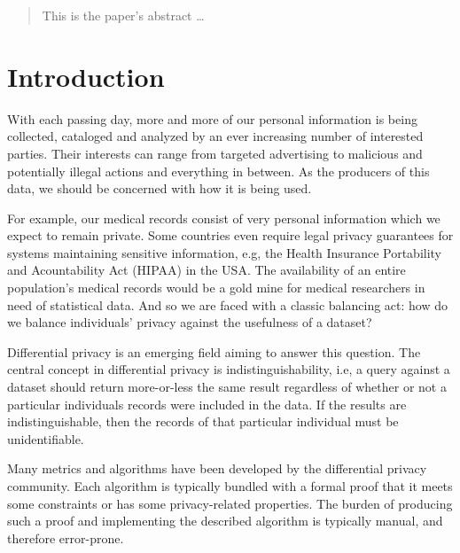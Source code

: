 \documentclass[12pt]{article}
\begin{document}
\maketitle

\lstset{language=Haskell,basicstyle=\footnotesize,frame=single,
        numbers=left}

\begin{abstract}
This is the paper's abstract \ldots
\end{abstract}

\section{Introduction}\label{sec:introduction}


With each passing day, more and more of our personal information is being collected, cataloged and analyzed by an ever increasing number of interested parties.
Their interests can range from targeted advertising to malicious and potentially illegal actions and everything in between.
As the producers of this data, we should be concerned with how it is being used.

For example, our medical records consist of very personal information which we expect to remain private.
Some countries even require legal privacy guarantees for systems maintaining sensitive information, e.g, the Health Insurance Portability and Acountability Act (HIPAA) in the USA.
The availability of an entire population's medical records would be a gold mine for medical researchers in need of statistical data.
And so we are faced with a classic balancing act: how do we balance individuals' privacy against the usefulness of a dataset?

Differential privacy\cite{journals/cacm/Dwork11} is an emerging field aiming to answer this question.
The central concept in differential privacy is indistinguishability, i.e, a query against a dataset should return more-or-less the same result regardless of whether or not a particular individuals records were included in the data.
If the results are indistinguishable, then the records of that particular individual must be unidentifiable.

Many metrics and algorithms have been developed by the differential privacy community.
Each algorithm is typically bundled with a formal proof that it meets some constraints or has some privacy-related properties.
The burden of producing such a proof and implementing the described algorithm is typically manual, and therefore error-prone.
\end{document}
